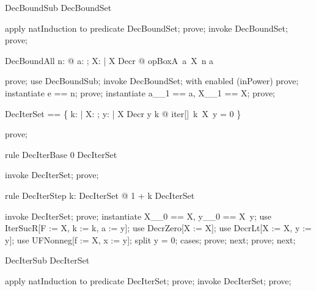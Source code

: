 \documentclass{article}
\begin{document}
\begin{theorem}{DecBoundSub}
  \nat \subseteq DecBoundSet
\end{theorem}

\begin{zproof}
apply natInduction to predicate \nat \subseteq DecBoundSet;
prove;
invoke DecBoundSet;
prove;
\end{zproof}

\begin{theorem}{DecBoundAll}
  \forall n: \nat @ \forall a: \nat; X: \nat \fun \nat | X \in Decr @ opBoxA~a~X~n \leq a
\end{theorem}

\begin{zproof}
prove;
use DecBoundSub;
invoke DecBoundSet;
with enabled (inPower) prove;
instantiate e == n;
prove;
instantiate a\_\_1 == a, X\_\_1 == X;
prove;
\end{zproof}

\begin{zed}
  DecIterSet == \{ k: \nat | \forall X: \nat \fun \nat; y: \nat | X \in Decr \land y \leq k @ iter[\nat]~k~X~y = 0 \}
\end{zed}

\begin{zproof}
prove;
\end{zproof}

\begin{theorem}{rule DecIterBase}
  0 \in DecIterSet
\end{theorem}

\begin{zproof}
invoke DecIterSet;
prove;
\end{zproof}

\begin{theorem}{rule DecIterStep}
  \forall k: DecIterSet @ 1 + k \in DecIterSet
\end{theorem}

\begin{zproof}
invoke DecIterSet;
prove;
instantiate X\_\_0 == X, y\_\_0 == X~y;
use IterSucR[F := X, k := k, a := y];
use DecrZero[X := X];
use DecrLt[X := X, y := y];
use UFNonneg[f := X, x := y];
split y = 0;
cases;
prove;
next;
prove;
next;
\end{zproof}

\begin{theorem}{DecIterSub}
  \nat \subseteq DecIterSet
\end{theorem}

\begin{zproof}
apply natInduction to predicate \nat \subseteq DecIterSet;
prove;
invoke DecIterSet;
prove;
\end{zproof}
\end{document}
